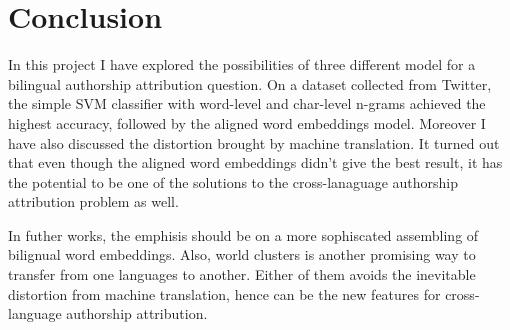 \documentclass[11pt,a4paper]{article}
\begin{document}
\section{Conclusion}\label{sec:conclusion}

In this project I have explored the possibilities of three different model for a bilingual authorship attribution question. On a dataset collected from Twitter, the simple SVM classifier with word-level and char-level n-grams achieved the highest accuracy, followed by the aligned word embeddings model. Moreover I have also discussed the distortion brought by machine translation. It turned out that even though the aligned word embeddings didn't give the best result, it has the potential to be one of the solutions to the cross-lanaguage authorship attribution problem as well.

In futher works, the emphisis should be on a more sophiscated assembling of bilignual word embeddings. Also, world clusters is another promising way to transfer from one languages to another. Either of them avoids the inevitable distortion from machine translation, hence can be the new features for cross-language authorship attribution.



\end{document}
